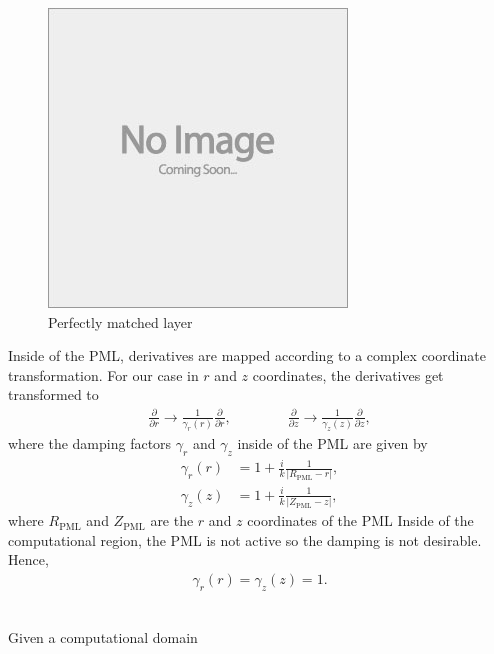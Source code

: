 \begin{figure}[h]
	\centering
	\includegraphics[draft]{images/placeholder}
	\caption{Perfectly matched layer \label{fig:pml}}
\end{figure}


Inside of the PML, derivatives are mapped according to a complex coordinate transformation.
For our case in $r$ and $z$ coordinates, the derivatives get transformed to
\begin{align}
	\frac{\partial}{\partial r} \rightarrow \frac{1}{\gamma_r(r)}\frac{\partial}{\partial r}, \qquad \qquad
	\frac{\partial}{\partial z} \rightarrow \frac{1}{\gamma_z(z)}\frac{\partial}{\partial z},
\end{align}
where the damping factors $\gamma_r$ and $\gamma_z$ inside of the PML are given by
\begin{align}
	\gamma_r(r) &= 1 + \frac{i}{k} \frac{1}{\left| R_{\text{PML}} - r \right|}, \\
	\gamma_z(z) &= 1 + \frac{i}{k} \frac{1}{\left| Z_{\text{PML}} - z \right|},
\end{align}
where $R_{\text{PML}}$ and $Z_{\text{PML}}$ are the $r$ and $z$ coordinates of the PML 
Inside of the computational region, the PML is not active so the damping is not desirable.
Hence,
\begin{align}
	\gamma_r(r) = \gamma_z(z) = 1.
\end{align}



\begin{align}
\end{align}

Given a computational domain 








